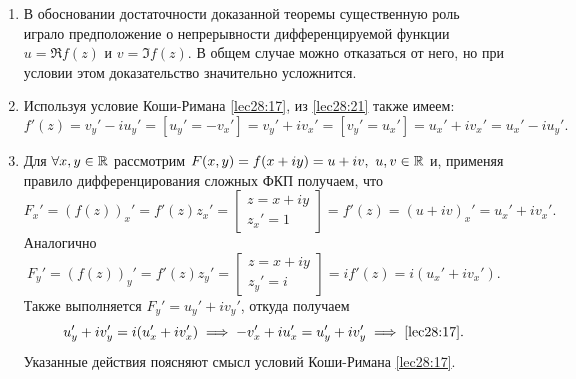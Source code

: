 \documentclass[../../main.tex]{subfiles}
\begin{document}
	
\begin{rems}

\;

\begin{enumerate}
	\item В обосновании достаточности доказанной теоремы существенную роль 
	играло предположение о непрерывности дифференцируемой функции 
	$ u = \Re f(z) $ и $ v = \Im f(z) $. В общем случае  можно отказаться 
	от него, но при условии этом доказательство значительно усложнится.
	\item Используя условие Коши-Римана \eqref{lec28:17}, из \eqref{lec28:21} 
	также имеем:
	\begin{equation}
	\label{lec29:22} 
	f'(z) = v_y' - iu_y' = \left[u_y' = -v_x'\right] =
	v_y' + iv_x' = \left[v_y' = u_x'\right] = u_x' + iv_x' = u_x' - iu_y'.
	\end{equation}
	\item Для $ \forall x, y \in \mathbb{R} $ рассмотрим 
	$ F(x, y) = f(x + iy) = u + iv,\ u, v \in \mathbb{R} $
	и, применяя правило дифференцирования сложных ФКП получаем, что 
	\[ 
	F_x' = (f(z))_x' = f'(z)z_x' = \left[
	\begin{gathered}
		z = x + iy\\
		z_x' = 1
	\end{gathered}
	\right] = f'(z) = (u + iv)_x' = u_x' + iv_x'.
	\]
	Аналогично
	\[ 
	F_y' = (f(z))_y' = f'(z)z_y' = \left[
	\begin{gathered}
	z = x + iy\\
	z_y' = i
	\end{gathered}
	\right] = if'(z) = i(u_x' + iv_x').\]
	Также выполняется $F_y' = u_y' + iv_y'$, откуда получаем
	\[u_y' + iv_y' = i(u_x' + iv_x') \implies -v_x' + iu_x' = u_y' + iv_y' 
	\implies \eqref{lec28:17}.\]
	Указанные действия поясняют смысл условий Коши-Римана \eqref{lec28:17}.
\end{enumerate}
\end{rems}
\end{document}
